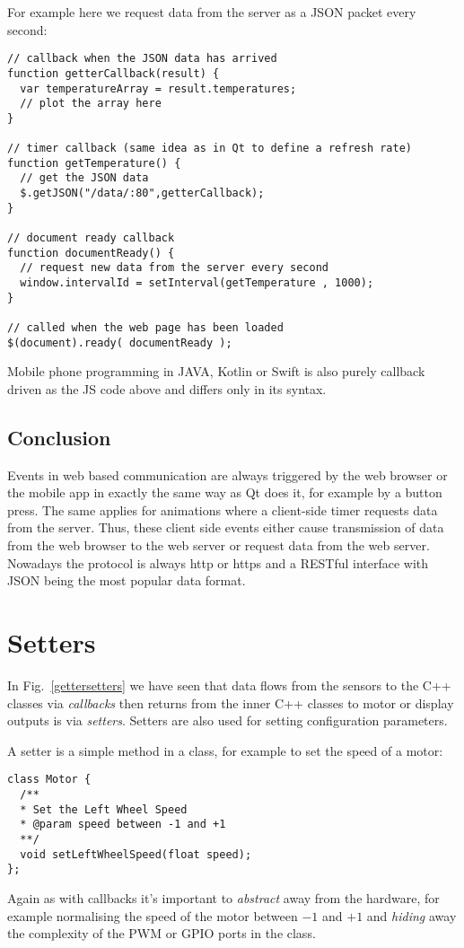 \documentclass[12pt]{report}
\begin{document}
For example here we request data from the server as a JSON
packet every second:

\begin{verbatim}
// callback when the JSON data has arrived
function getterCallback(result) {
  var temperatureArray = result.temperatures;
  // plot the array here
}

// timer callback (same idea as in Qt to define a refresh rate)
function getTemperature() {
  // get the JSON data
  $.getJSON("/data/:80",getterCallback);
}

// document ready callback
function documentReady() {
  // request new data from the server every second
  window.intervalId = setInterval(getTemperature , 1000);
}

// called when the web page has been loaded
$(document).ready( documentReady );
\end{verbatim}

Mobile phone programming in JAVA, Kotlin or Swift is also purely
callback driven as the JS code above and differs only in its syntax.

\section{Conclusion}
Events in web based communication are always triggered by the web
browser or the mobile app in exactly the same way as Qt does it, for
example by a button press. The same applies for animations where a
client-side timer requests data from the server. Thus, these client
side events either cause transmission of data from the web browser to
the web server or request data from the web server. Nowadays the protocol is
always http or https and a RESTful interface with JSON
being the most popular data format.


\chapter{Setters\label{setters}}
In Fig.~\ref{gettersetters} we have seen that data flows from
the sensors to the C++ classes via \textsl{callbacks} then returns
from the inner C++ classes to motor or display outputs is via
\textsl{setters}. Setters are also used for setting configuration
parameters.

A setter is a simple method in a class, for example to set the
speed of a motor:
\begin{verbatim}
class Motor {
  /**
  * Set the Left Wheel Speed
  * @param speed between -1 and +1
  **/
  void setLeftWheelSpeed(float speed);
};
\end{verbatim}
Again as with callbacks it's important to \textsl{abstract} away from the
hardware, for example normalising the speed of the
motor between $-1$ and $+1$ and \textsl{hiding} away the complexity of the
PWM or GPIO ports in the class.
\end{document}
